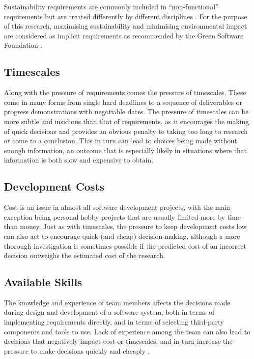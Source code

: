 Sustainability requirements are commonly included in \enquote{non-functional} requirements but are treated differently by different disciplines \citep{Venters2017a}. For the purpose of this research, maximising sustainability and minimising environmental impact are considered as implicit requirements as recommended by the Green Software Foundation \citep{GreenSoftwareFioundation2024}.

\subsection{Timescales}

Along with the pressure of requirements comes the pressure of timescales. These come in many forms from single hard deadlines to a sequence of deliverables or progress demonstrations with negotiable dates. The pressure of timescales can be more subtle and insidious than that of requirements, as it encourages the making of quick decisions and provides an obvious penalty to taking too long to research or come to a conclusion. This in turn can lead to choices being made without enough information, an outcome that is especially likely in situations where that information is both slow and expensive to obtain.

\subsection{Development Costs}

Cost is an issue in almost all software development projects, with the main exception being personal hobby projects that are usually limited more by time than money. Just as with timescales, the pressure to keep development costs low can also act to encourage quick (and cheap) decision-making, although a more thorough investigation is sometimes possible if the predicted cost of an incorrect decision outweighs the estimated cost of the research.

\subsection{Available Skills}

The knowledge and experience of team members affects the decisions made during design and development of a software system, both in terms of implementing requirements directly, and in terms of selecting third-party components and tools to use. Lack of experience among the team can also lead to decisions that negatively impact cost or timescales, and in turn increase the pressure to make decisions quickly and cheaply \citep{Jiang2007a}.

